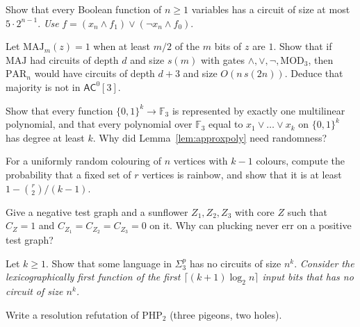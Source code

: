 \begin{exercise}[$\star\star$]\label{ex:everyfn}
Show that every Boolean function of $n\ge1$ variables has a circuit of size at most $5\cdot2^{n-1}$. \emph{Use} $f=(x_n\land f_1)\lor(\lnot x_n\land f_0)$.
\end{exercise}

\begin{exercise}[$\star\star$]\label{ex:majparity}
Let $\mathrm{MAJ}_m(z)=1$ when at least $m/2$ of the $m$ bits of $z$ are $1$. Show that if $\mathrm{MAJ}$ had circuits of depth $d$ and size $s(m)$ with gates $\land,\lor,\lnot,\mathrm{MOD}_3$, then $\mathrm{PAR}_n$ would have circuits of depth $d+3$ and size $O(n\,s(2n))$. Deduce that majority is not in $\mathsf{AC}^0[3]$.
\end{exercise}

\begin{exercise}[$\star$]\label{ex:orexact}
Show that every function $\{0,1\}^k\to\mathbb F_3$ is represented by exactly one multilinear polynomial, and that every polynomial over $\mathbb F_3$ equal to $x_1\lor\dots\lor x_k$ on $\{0,1\}^k$ has degree at least $k$. Why did Lemma~\ref{lem:approxpoly} need randomness?
\end{exercise}

\begin{exercise}[$\star$]\label{ex:rainbow}
For a uniformly random colouring of $n$ vertices with $k-1$ colours, compute the probability that a fixed set of $r$ vertices is rainbow, and show that it is at least $1-\binom r2/(k-1)$.
\end{exercise}

\begin{exercise}[$\star$]\label{ex:pluckerror}
Give a negative test graph and a sunflower $Z_1,Z_2,Z_3$ with core $Z$ such that $C_Z=1$ and $C_{Z_1}=C_{Z_2}=C_{Z_3}=0$ on it. Why can plucking never err on a positive test graph?
\end{exercise}

\begin{exercise}[$\star\star$]\label{ex:kannan}
Let $k\ge1$. Show that some language in $\Sigma_3^p$ has no circuits of size $n^k$. \emph{Consider the lexicographically first function of the first $\lceil(k+1)\log_2n\rceil$ input bits that has no circuit of size $n^k$.}
\end{exercise}

\begin{exercise}[$\star$]\label{ex:php32}
Write a resolution refutation of $\mathrm{PHP}_2$ (three pigeons, two holes).
\end{exercise}

